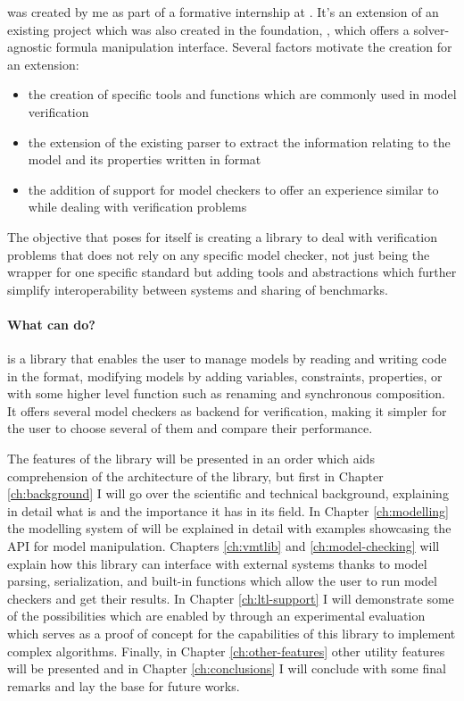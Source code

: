 \pyvmt{} was created by me as part of a formative internship at \FBK{}. It's an extension of an existing project which was also created in the foundation, \pysmt{}, which offers a solver-agnostic formula manipulation interface.
Several factors motivate the creation for an extension:
\begin{itemize}
  \item the creation of specific tools and functions which are commonly used in model verification
  \item the extension of the existing \smtlib{} parser to extract the information relating to the model and its properties written in \vmtlib{} format
  \item the addition of support for model checkers to offer an experience similar to \pysmt{} while dealing with verification problems
\end{itemize}

The objective that \pyvmt{} poses for itself is creating a library to deal with verification problems that does not rely on any specific model checker, not just being the wrapper for one specific standard but adding tools and abstractions which further simplify interoperability between systems and sharing of benchmarks.

\paragraph*{What can \pyvmt{} do?}
\pyvmt{} is a \python{} library that enables the user to manage \vmt{} models by reading and writing code in the \vmtlib{} format, modifying models by adding variables, constraints, properties, or with some higher level function such as renaming and synchronous composition. It offers several model checkers as backend for verification, making it simpler for the user to choose several of them and compare their performance.

The features of the library will be presented in an order which aids comprehension of the architecture of the library, but first in Chapter \ref{ch:background} I will go over the scientific and technical background, explaining in detail what \pysmt{} is and the importance it has in its field.
In Chapter \ref{ch:modelling} the modelling system of \pyvmt{} will be explained in detail with examples showcasing the API for model manipulation.
Chapters \ref{ch:vmtlib} and \ref{ch:model-checking} will explain how this library can interface with external systems thanks to model parsing, serialization, and built-in functions which allow the user to run model checkers and get their results.
In Chapter \ref{ch:ltl-support} I will demonstrate some of the possibilities which are enabled by \pyvmt{} through an experimental evaluation which serves as a proof of concept for the capabilities of this library to implement complex algorithms.
Finally, in Chapter \ref{ch:other-features} other utility features will be presented and in Chapter \ref{ch:conclusions} I will conclude with some final remarks and lay the base for future works.


